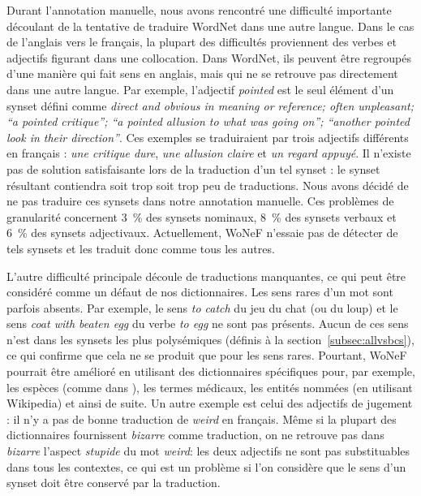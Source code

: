 Durant l'annotation manuelle, nous avons rencontré une difficulté importante
découlant de la tentative de traduire WordNet dans une autre langue. Dans le
cas de l'anglais vers le français, la plupart des difficultés proviennent des
verbes et adjectifs figurant dans une collocation. Dans WordNet, ils peuvent
être regroupés d'une manière qui fait sens en anglais, mais qui ne se retrouve
pas directement dans une autre langue. Par exemple, l'adjectif \textit{pointed}
est le seul élément d'un synset défini comme \textit{direct and obvious in
meaning or reference; often unpleasant; ``a pointed critique''; ``a pointed
allusion to what was going on''; ``another pointed look in their direction''}.
Ces exemples se traduiraient par trois adjectifs différents en français :
\textit{une critique dure}, \textit{une allusion claire} et \textit{un regard
appuyé}. Il n'existe pas de solution satisfaisante lors de la traduction d'un
tel synset : le synset résultant contiendra soit trop soit trop peu de
traductions. Nous avons décidé de ne pas traduire ces synsets dans notre
annotation manuelle. Ces problèmes de granularité concernent 3~\% des synsets
nominaux, 8~\% des synsets verbaux et 6~\% des synsets adjectivaux.
Actuellement, WoNeF n'essaie pas de détecter de tels synsets et les traduit
donc comme tous les autres.

L'autre difficulté principale découle de traductions manquantes, ce qui peut
être considéré comme un défaut de nos dictionnaires. Les sens rares d'un mot
sont parfois absents. Par exemple, le sens \textit{to catch} du jeu du chat (ou
du loup) et le sens \textit{coat with beaten egg} du verbe \textit{to egg} ne
sont pas présents. Aucun de ces sens n'est dans les synsets les plus
polysémiques (définis à la section~\ref{subsec:allvsbcs}), ce qui confirme que
cela ne se produit que pour les sens rares. Pourtant, WoNeF pourrait être
amélioré en utilisant des dictionnaires spécifiques pour, par exemple, les
espèces (comme dans \cite{sagot2008construction}), les termes médicaux, les
entités nommées (en utilisant Wikipedia) et ainsi de suite. Un autre exemple
est celui des adjectifs de jugement : il n'y a pas de bonne traduction de
\textit{weird} en français. Même si la plupart des dictionnaires fournissent
\textit{bizarre} comme traduction, on ne retrouve pas dans \textit{bizarre}
l'aspect \textit{stupide} du mot \textit{weird}: les deux adjectifs ne sont pas
substituables dans tous les contextes, ce qui est un problème si l'on considère
que le sens d'un synset doit être conservé par la traduction.

